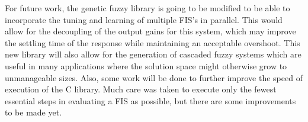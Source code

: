 \documentclass[12pt]{article}
\begin{document}
For future work, the genetic fuzzy library is going to be modified to be able to incorporate the tuning and learning of multiple FIS's in parallel. This would allow for the decoupling of the output gains for this system, which may improve the settling time of the response while maintaining an acceptable overshoot. This new library will also allow for the generation of cascaded fuzzy systems which are useful in many applications where the solution space might otherwise grow to unmanageable sizes. Also, some work will be done to further improve the speed of execution of the C library. Much care was taken to execute only the fewest essential steps in evaluating a FIS as possible, but there are some improvements to be made yet.
\end{document}
